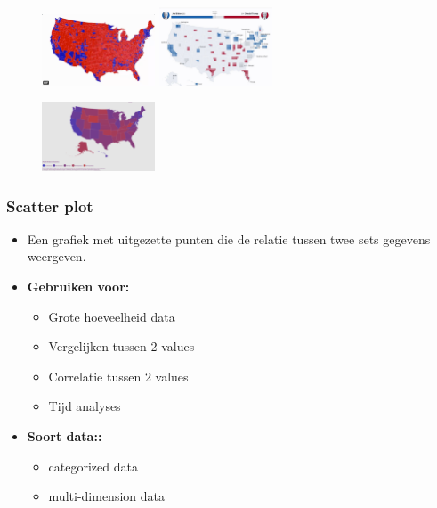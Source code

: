 \documentclass{article}
\newcommand{\bold}[1]{\textbf{#1}}
\begin{document}
\begin{figure}[H]
    \centering
    \includegraphics[width=0.3\textwidth]{dv-map7.png}
    \includegraphics[width=0.3\textwidth]{dv-map8.png}
    \caption{}
\end{figure}
\begin{figure}[H]
    \centering
    \includegraphics[width=0.3\textwidth]{dv-map9.png}
    \caption{}
\end{figure}

\subsubsection{Scatter plot}

\begin{itemize}
    \item Een grafiek met uitgezette punten die de relatie tussen twee sets gegevens weergeven.
    \item \bold{Gebruiken voor:}
    \begin{itemize}
        \item Grote hoeveelheid data
        \item Vergelijken tussen 2 values
        \item Correlatie tussen 2 values
        \item Tijd analyses
    \end{itemize}
    \item \bold{\bold{Soort data:}:}
    \begin{itemize}
        \item categorized data
        \item multi-dimension data
    \end{itemize}
\end{itemize}
\end{document}

